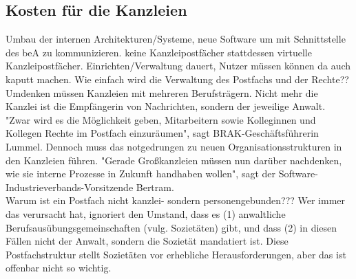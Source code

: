 \subsection{Kosten für die Kanzleien}
Umbau der internen Architekturen/Systeme, neue Software um mit Schnittstelle des beA zu kommunizieren. keine Kanzleipostfächer stattdessen virtuelle Kanzleipostfächer. Einrichten/Verwaltung dauert, Nutzer müssen können da auch kaputt machen. Wie einfach wird die Verwaltung des Postfachs und der Rechte?? \\
Umdenken müssen Kanzleien mit mehreren Berufsträgern. Nicht mehr die Kanzlei ist die Empfängerin von Nachrichten, sondern der jeweilige Anwalt. "Zwar wird es die Möglichkeit geben, Mitarbeitern sowie Kolleginnen und Kollegen Rechte im Postfach einzuräumen", sagt BRAK-Geschäftsführerin Lummel. Dennoch muss das notgedrungen zu neuen Organisationsstrukturen in den Kanzleien führen. "Gerade Großkanzleien müssen nun darüber nachdenken, wie sie interne Prozesse in Zukunft handhaben wollen", sagt der Software-Industrieverbands-Vorsitzende Bertram. \\
Warum ist ein Postfach nicht kanzlei- sondern personengebunden??? Wer immer das verursacht hat, ignoriert den Umstand, dass es (1) anwaltliche Berufsausübungsgemeinschaften (vulg. Sozietäten) gibt, und dass (2) in diesen Fällen nicht der Anwalt, sondern die Sozietät mandatiert ist. Diese Postfachstruktur stellt Sozietäten vor erhebliche Herausforderungen, aber das ist offenbar nicht so wichtig.
